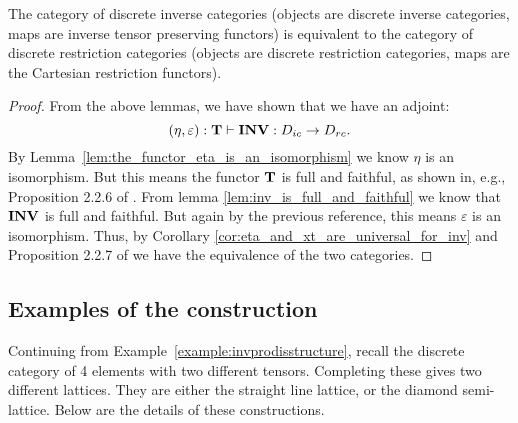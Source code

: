 \begin{theorem}\label{thm:discrete_inverse_categories_are_equivalent_to_discrete_restriction_categories}
  The category of discrete inverse categories (objects are discrete inverse categories, maps are
  inverse tensor preserving functors) is equivalent to the category of discrete restriction
  categories (objects are discrete restriction categories, maps are the Cartesian restriction
  functors).
\end{theorem}
\begin{proof}
  From the above lemmas, we have shown that we have an adjoint:
  \begin{equation}
    (\eta,\varepsilon):\mathbf{T} \vdash \mathbf{INV} :D_{i c} \to D_{r c}. \label{eq:inv_and_wtf_are_adjoint_pair}
  \end{equation}
  By Lemma~\ref{lem:the_functor_eta_is_an_isomorphism} we know $\eta$ is an isomorphism. But this
  means the functor $\mathbf{T}$ is full and faithful, as shown in, e.g., Proposition 2.2.6 of
  \cite{cockett2009:ctcs}. From lemma \ref{lem:inv_is_full_and_faithful} we know that $\mathbf{INV}$ is
  full and faithful. But again by the previous reference, this means $\varepsilon$ is an
  isomorphism. Thus, by Corollary \ref{cor:eta_and_xt_are_universal_for_inv} and Proposition 2.2.7
  of \cite{cockett2009:ctcs} we have the equivalence of the two categories.
\end{proof}
\subsection{Examples of the \texorpdfstring{\wtc}{tilde} construction} %
\label{sub:examples_of_the_wtf_construction}

\begin{example}
  \label{example:completing_a_finite_discrete_inverse_category}
\end{example}
Continuing from Example~\ref{example:invprodisstructure}, recall the discrete category of 4
elements with two different tensors. Completing these gives two different lattices. They are either
the straight line lattice, or the diamond semi-lattice. Below are the details of these constructions.


